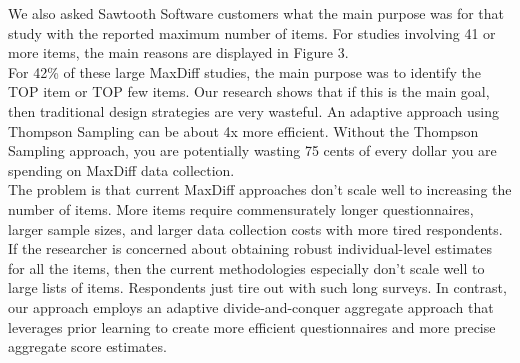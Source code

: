 \documentclass[nonblindrev]{informs3}
\begin{document}
We also asked Sawtooth Software customers what the main purpose was for that study with the reported maximum number of items.  For studies involving 41 or more items, the main reasons are displayed in Figure 3.\\
For 42\% of these large MaxDiff studies, the main purpose was to identify the TOP item or TOP few items.  Our research shows that if this is the main goal, then traditional design strategies are very wasteful.  An adaptive approach using Thompson Sampling can be about 4x more efficient.  Without the Thompson Sampling approach, you are potentially wasting 75 cents of every dollar you are spending on MaxDiff data collection. \\
The problem is that current MaxDiff approaches don't scale well to increasing the number of items.  More items require commensurately longer questionnaires, larger sample sizes, and larger data collection costs with more tired respondents.  If the researcher is concerned about obtaining robust individual-level estimates for all the items, then the current methodologies especially don't scale well to large lists of items.  Respondents just tire out with such long surveys.  In contrast, our approach employs an adaptive divide-and-conquer aggregate approach that leverages prior learning to create more efficient questionnaires and more precise aggregate score estimates. 
\end{document}
